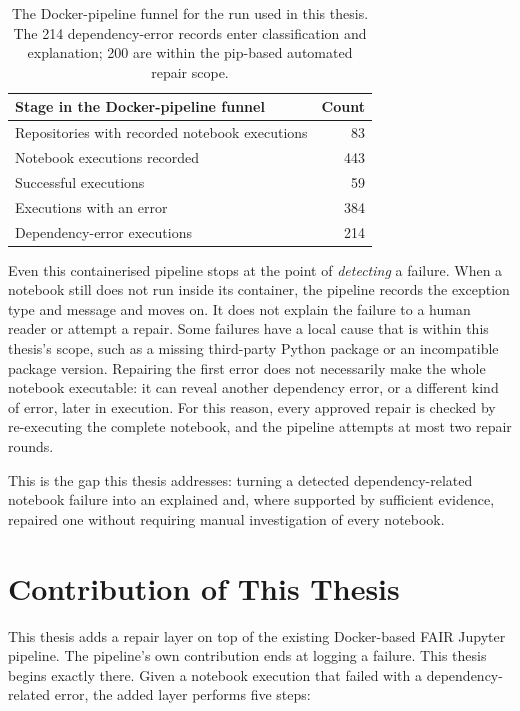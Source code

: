 \begin{table}[htbp]
  \centering
  \small
  \begin{tabular}{|l|r|}
    \hline
    \textbf{Stage in the Docker-pipeline funnel} & \textbf{Count} \\
    \hline
    Repositories with recorded notebook executions & 83 \\
    \hline
    Notebook executions recorded & 443 \\
    \hline
    Successful executions & 59 \\
    \hline
    Executions with an error & 384 \\
    \hline
    Dependency-error executions & 214 \\
    \hline
  \end{tabular}
  \caption{The Docker-pipeline funnel for the run used in this thesis. The
  214 dependency-error records enter classification and explanation; 200 are
  within the pip-based automated repair scope.}
  \label{tab:intro-docker-funnel}
\end{table}

Even this containerised pipeline stops at the point of \emph{detecting} a
failure. When a notebook still does not run inside its container, the
pipeline records the exception type and message and moves on. It does not
explain the failure to a human reader or attempt a repair. Some failures have
a local cause that is within this thesis's scope, such as a missing
third-party Python package or an incompatible package version. Repairing the
first error does not necessarily make the whole notebook executable: it can
reveal another dependency error, or a different kind of error, later in
execution. For this reason, every approved repair is checked by re-executing
the complete notebook, and the pipeline attempts at most two repair rounds.

This is the gap this thesis addresses: turning a detected dependency-related
notebook failure into an explained and, where supported by sufficient
evidence, repaired one without requiring manual investigation of every
notebook.

\section{Contribution of This Thesis}
\label{sec:intro-contribution}

This thesis adds a repair layer on top of the existing Docker-based FAIR
Jupyter pipeline. The pipeline's own contribution ends at logging a
failure. This thesis begins exactly there. Given a notebook execution
that failed with a dependency-related error, the added layer performs
five steps:

